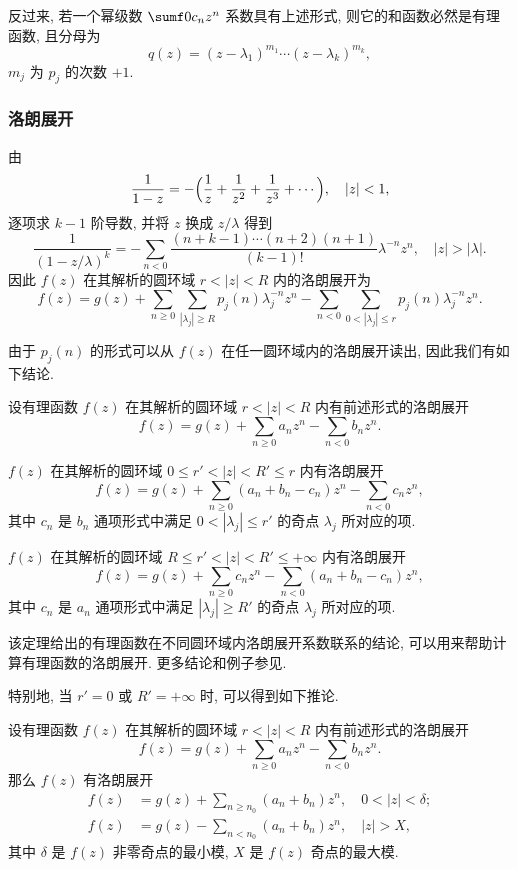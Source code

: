 反过来, 若一个幂级数 $\sumf0 c_nz^n$ 系数具有上述形式, 则它的和函数必然是有理函数, 且分母为 
\[
  q(z)=(z-\lambda_1)^{m_1}\cdots (z-\lambda_k)^{m_k},
\]
$m_j$ 为 $p_j$ 的次数 $+1$.


\subsubsection{洛朗展开}

由
\[
  \frac1{1-z}=-\Bigl(\frac1z+\frac1{z^2}+\frac1{z^3}+\cdots\Bigr),\quad |z|<1,
\]
逐项求 $k-1$ 阶导数, 并将 $z$ 换成 $z/\lambda$ 得到
\[
    \frac1{(1-z/\lambda)^k}
   =-\sum_{n<0} \frac{(n+k-1)\cdots(n+2)(n+1)}{(k-1)!}\lambda^{-n}z^n,\quad |z|>|\lambda|.
\]
因此 $f(z)$ 在其解析的圆环域 $r<|z|<R$ 内的洛朗展开为
\[
  f(z)=g(z)+\sum_{n\ge 0} \sum_{|\lambda_j|\ge R} p_j(n)\lambda_j^{-n}z^n
  -\sum_{n<0} \sum_{0<|\lambda_j|\le r} p_j(n)\lambda_j^{-n}z^n.
\]

由于 $p_j(n)$ 的形式可以从 $f(z)$ 在任一圆环域内的洛朗展开读出, 因此我们有如下结论.
  
\begin{theorem}
  \label{thm:rational-function-laurent}
  设有理函数 $f(z)$ 在其解析的圆环域 $r<|z|<R$ 内有前述形式的洛朗展开
  \[
    f(z)=g(z)+\sum_{n\ge 0} a_n z^n-\sum_{n<0} b_n z^n.
  \]
  \vspace{-\baselineskip}
  \begin{enumpar}
    \item $f(z)$ 在其解析的圆环域 $0\le r'<|z|<R'\le r$ 内有洛朗展开
      \[
        f(z)=g(z)+\sum_{n\ge 0} (a_n+b_n-c_n) z^n-\sum_{n<0} c_n z^n,
      \]
      其中 $c_n$ 是 $b_n$ 通项形式中满足 $0<|\lambda_j|\le r'$ 的奇点 $\lambda_j$ 所对应的项.
    \item $f(z)$ 在其解析的圆环域 $R\le r'<|z|<R'\le+\infty$ 内有洛朗展开
    \[
      f(z)=g(z)+\sum_{n\ge 0} c_n z^n-\sum_{n<0} (a_n+b_n-c_n) z^n,
    \]
    其中 $c_n$ 是 $a_n$ 通项形式中满足 $|\lambda_j|\ge R'$ 的奇点 $\lambda_j$ 所对应的项.
  \end{enumpar}
\end{theorem}
  
该定理给出的有理函数在不同圆环域内洛朗展开系数联系的结论, 可以用来帮助计算有理函数的洛朗展开. 
更多结论和例子参见\cite{YuanZhang2024}.

特别地, 当 $r'=0$ 或 $R'=+\infty$ 时, 可以得到如下推论. 

\begin{corollary}
  \label{cor:rational-function-laurent}
  设有理函数 $f(z)$ 在其解析的圆环域 $r<|z|<R$ 内有前述形式的洛朗展开
  \[
    f(z)=g(z)+\sum_{n\ge 0} a_n z^n-\sum_{n<0} b_n z^n.
  \]
  那么 $f(z)$ 有洛朗展开
  \begin{align*}
    f(z)&=g(z)+\sum_{n\ge n_0} (a_n+b_n) z^n,\quad 0<|z|<\delta;\\
    f(z)&=g(z)-\sum_{n<n_0} (a_n+b_n) z^n,\quad |z|>X,
  \end{align*} 
  其中 $\delta$ 是 $f(z)$ 非零奇点的最小模, $X$ 是 $f(z)$ 奇点的最大模.
\end{corollary}

